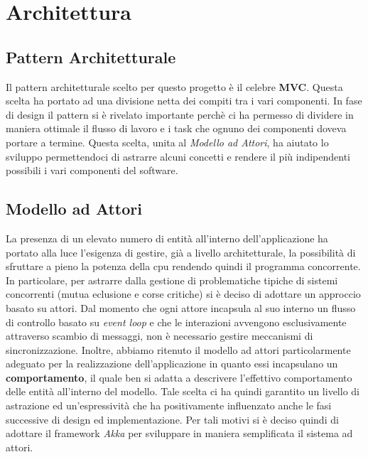 \section{Architettura}

\subsection{Pattern Architetturale}
Il pattern architetturale scelto per questo progetto è il celebre \textbf{MVC}.
Questa scelta ha portato ad una divisione netta dei compiti tra i vari componenti. In fase di design il pattern si
è rivelato importante perchè ci ha permesso di dividere in maniera ottimale il flusso di lavoro e i task che ognuno dei
componenti doveva portare a termine. Questa scelta, unita al \textit{Modello ad Attori}, ha aiutato
lo sviluppo permettendoci di astrarre alcuni concetti e rendere il più indipendenti possibili i vari componenti del software.

\subsection{Modello ad Attori}
La presenza di un elevato numero di entità all’interno dell’applicazione ha portato alla luce
l’esigenza di gestire, già a livello architetturale, la possibilità di sfruttare a pieno la potenza
della cpu rendendo quindi il programma concorrente. In particolare, per astrarre dalla gestione
di problematiche tipiche di sistemi concorrenti (mutua eclusione e corse critiche) si è deciso di
adottare un approccio basato su attori. Dal momento che ogni attore incapsula al suo interno
un flusso di controllo basato su \textit{event loop} e che le interazioni avvengono esclusivamente
attraverso scambio di messaggi, non è necessario gestire meccanismi di sincronizzazione.
Inoltre, abbiamo ritenuto il modello ad attori particolarmente adeguato per la realizzazione
dell’applicazione in quanto essi incapsulano un \textbf{comportamento}, il quale ben si adatta a
descrivere l’effettivo comportamento delle entità all’interno del modello. Tale scelta ci ha
quindi garantito un livello di astrazione ed un’espressività che ha positivamente influenzato
anche le fasi successive di design ed implementazione. Per tali motivi si è deciso quindi di adottare il framework
\textit{Akka} per sviluppare in maniera semplificata il sistema ad attori.

